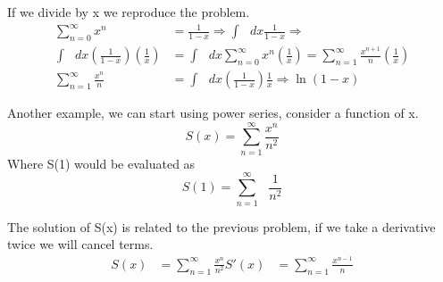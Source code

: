 \documentclass{article}
\newcommand{\be}{\begin{equation}}
\newcommand{\ee}{\end{equation}}
\newcommand{\sums}{\sum_{n=0}^\infty}
\begin{document}
If we divide by x we reproduce the problem.
\be
\begin{split}
	\sums x^n &= \frac{1}{1-x} \Rightarrow \int \text{ } dx \frac{1}{1-x} \Rightarrow\\
	\int \text{ } dx \left(\frac{1}{1-x}\right)\left(\frac{1}{x}\right) &= \int \text{ } dx \sums x^n\left(\frac{1}{x}\right) = \sum_{n=1}^\infty \frac{x^{n+1}}{n} \left(\frac{1}{x}\right) \\
	\sum_{n=1}^\infty \frac{x^n}{n} &= \int \text{ } dx \left(\frac{1}{1-x}\right) \frac{1}{x} \Rightarrow \ln(1-x)
\end{split}
\ee

Another example, we can start using power series, consider a function of x.
\be
S(x) = \sum_{n=1}^\infty \frac{x^n}{n^2}
\ee
Where S(1) would be evaluated as
\be
S(1) = \sum_{n=1}^\infty \text{ }\frac{1}{n^2}
\ee

The solution of S(x) is related to the previous problem, if we take a derivative twice we will cancel terms. 
\be
\begin{split}
	S(x) &= \sum_{n=1}^\infty \frac{x^n}{n^2}
	S'(x) &= \sum_{n=1}^\infty \frac{x^{n-1}}{n}
\end{split}
\ee
\end{document}
